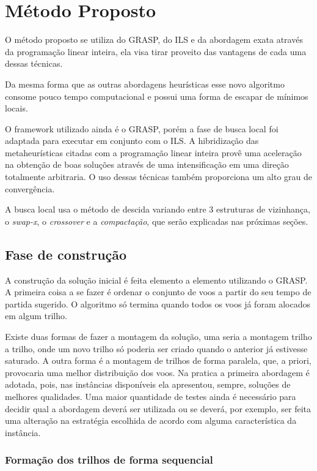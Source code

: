   \chapter{Método Proposto}
  
  O método proposto se utiliza do GRASP, do ILS e da abordagem exata através da programação linear inteira, ela visa tirar proveito das vantagens de cada uma dessas técnicas.
  
	Da mesma forma que as outras abordagens heurísticas esse novo algoritmo consome pouco tempo computacional e possui uma forma de escapar de mínimos locais.
  
  O framework utilizado ainda é o GRASP, porém a fase de busca local foi adaptada para executar em conjunto com o ILS. A hibridização das metaheurísticas citadas com a programação linear inteira provê uma aceleração na obtenção de boas soluções através de uma intensificação em uma direção totalmente arbitraria. O uso dessas técnicas também proporciona um alto grau de convergência.

  A busca local usa o método de descida variando entre 3 estruturas de vizinhança, o \textit{swap-x}, o \textit{crossover} e a \textit{compactação}, que serão explicadas nas próximas seções.
  
\section{Fase de construção}
  
  A construção da solução inicial é feita elemento a elemento utilizando o GRASP. A primeira coisa a se fazer é ordenar o conjunto de voos a partir do seu tempo de partida sugerido. O algoritmo só termina quando todos os voos já foram alocados em algum trilho.
  
  Existe duas formas de fazer a montagem da solução, uma seria a montagem trilho a trilho, onde um novo trilho só poderia ser criado quando o anterior já estivesse saturado. A outra forma é a montagem de trilhos de forma paralela, que, a priori, provocaria uma melhor distribuição dos voos. Na pratica a primeira abordagem é adotada, pois, nas instâncias disponíveis ela apresentou, sempre, soluções de melhores qualidades. Uma maior quantidade de testes ainda é necessário para decidir qual a abordagem deverá ser utilizada ou se deverá, por exemplo, ser feita uma alteração na estratégia escolhida de acordo com alguma característica da instância.
  
\subsection{Formação dos trilhos de forma sequencial}

